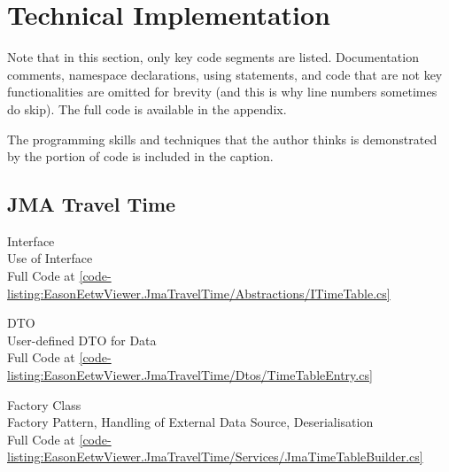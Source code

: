 \chapter{Technical Implementation}

Note that in this section, only key code segments are listed. Documentation comments, namespace declarations, using statements, and code that are not key functionalities are omitted for brevity (and this is why line numbers sometimes do skip). The full code is available in the appendix.

The programming skills and techniques that the author thinks is demonstrated by the portion of code is included in the caption.

\section{JMA Travel Time}
\begin{normallisting}
    \caption[ Interface]{
         Interface \\
        Use of Interface \\
        Full Code at \autoref{code-listing:EasonEetwViewer.JmaTravelTime/Abstractions/ITimeTable.cs}}
\end{normallisting}

\begin{normallisting}
    \caption[ DTO]{
         DTO \\
        User-defined DTO for Data \\
        Full Code at \autoref{code-listing:EasonEetwViewer.JmaTravelTime/Dtos/TimeTableEntry.cs}}
\end{normallisting}

\begin{normallisting}
    \caption[ Factory Class]{
         Factory Class \\
        Factory Pattern, Handling of External Data Source, Deserialisation \\
        Full Code at \autoref{code-listing:EasonEetwViewer.JmaTravelTime/Services/JmaTimeTableBuilder.cs}}
\end{normallisting}

